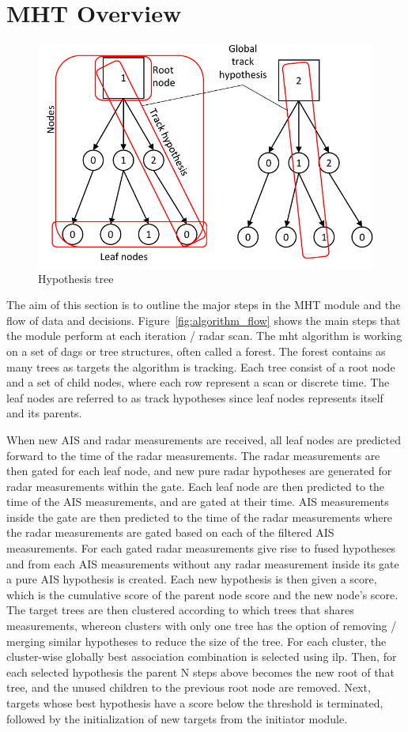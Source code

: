 \section{MHT Overview}
\begin{figure}
 \centering
 \includegraphics{Figures/Track-tree.pdf}
 \caption{Hypothesis tree}\label{fig:hyp_tree}
\end{figure}
The aim of this section is to outline the major steps in the MHT module and the flow of data and decisions. Figure~\ref{fig:algorithm_flow} shows the main steps that the module perform at each iteration / radar scan. The \gls{mht} algorithm is working on a set of \glspl{dag} or tree structures, often called a forest. The forest contains as many trees as targets the algorithm is tracking. Each tree consist of a root node and a set of child nodes, where each row represent a scan or discrete time. The leaf nodes are referred to as track hypotheses since leaf nodes represents itself and its parents.

 When new AIS and radar measurements are received, all leaf nodes are predicted forward to the time of the radar measurements. The radar measurements are then gated for each leaf node, and new pure radar hypotheses are generated for radar measurements within the gate. Each leaf node are then predicted to the time of the AIS measurements, and are gated at their time. AIS measurements inside the gate are then predicted to the time of the radar measurements where the radar measurements are gated based on each of the filtered AIS measurements. For each gated radar measurements give rise to fused hypotheses and from each AIS measurements without any radar measurement inside its gate a pure AIS hypothesis is created. Each new hypothesis is then given a score, which is the cumulative score of the parent node score and the new node's score. The target trees are then clustered according to which trees that shares measurements, whereon clusters with only one tree has the option of removing / merging similar hypotheses to reduce the size of the tree. For each cluster, the cluster-wise globally best association combination is selected using \gls{ilp}. Then, for each selected hypothesis the parent N steps above becomes the new root of that tree, and the unused children to the previous root node are removed. Next, targets whose best hypothesis have a score below the threshold is terminated, followed by the initialization of new targets from the initiator module. 

